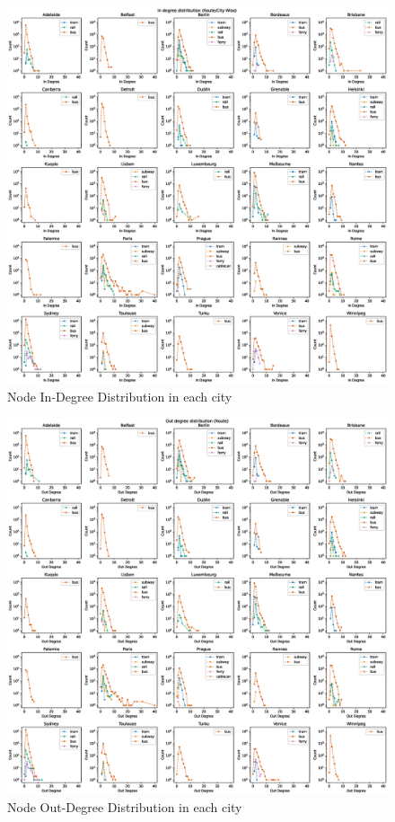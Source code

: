 \documentclass{article}
\theoremstyle{plain}
\theoremstyle{definition}
\theoremstyle{remark}
\begin{document}
\begin{figure}[ht]
\vskip -0.1in
\begin{center}
\centerline{\includegraphics[width=\columnwidth]{images/in_deg_distribution.eps}}
\caption{Node In-Degree Distribution in each city}
\label{in-deg}
\end{center}
\vskip -0.3in
\end{figure}

\begin{figure}[ht]
\vskip -0.1in
\begin{center}
\centerline{\includegraphics[width=\columnwidth]{images/out_deg_distribution.eps}}
\caption{Node Out-Degree Distribution in each city}
\label{out-deg}
\end{center}
\vskip -0.3in
\end{figure}
\end{document}
